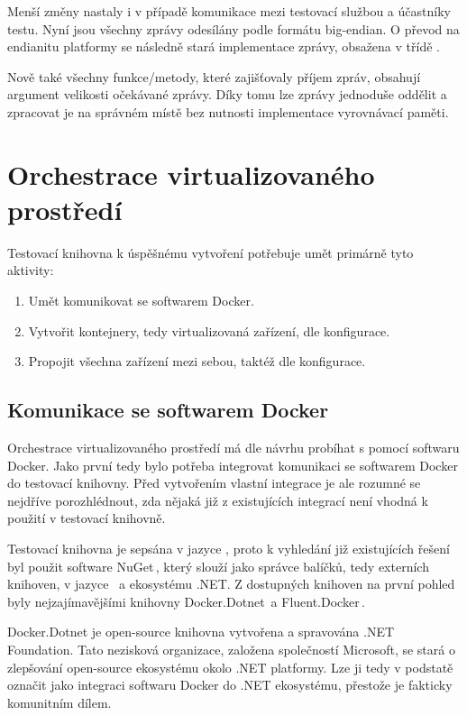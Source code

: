 Menší změny nastaly i v případě komunikace mezi testovací službou a účastníky testu. Nyní jsou všechny zprávy odesílány podle formátu big-endian. O převod na endianitu platformy se následně stará implementace zprávy, obsažena v třídě . 

Nově také všechny funkce/metody, které zajišťovaly příjem zpráv, obsahují argument velikosti očekávané zprávy. Díky tomu lze zprávy jednoduše oddělit a zpracovat je na správném místě bez nutnosti implementace vyrovnávací paměti.

\section{Orchestrace virtualizovaného prostředí}

Testovací knihovna k úspěšnému vytvoření potřebuje umět primárně tyto aktivity:

\begin{enumerate}
    \item Umět komunikovat se softwarem Docker.
    \item Vytvořit kontejnery, tedy virtualizovaná zařízení, dle konfigurace.
    \item Propojit všechna zařízení mezi sebou, taktéž dle konfigurace.
\end{enumerate}

\subsection{Komunikace se softwarem Docker}
Orchestrace virtualizovaného prostředí má dle návrhu probíhat s pomocí softwaru Docker. 
Jako první tedy bylo potřeba integrovat komunikaci se softwarem Docker do testovací knihovny. Před vytvořením vlastní integrace je ale rozumné se nejdříve porozhlédnout, zda nějaká již z existujících integrací není vhodná k použití v testovací knihovně. 

Testovací knihovna je sepsána v jazyce \csharp, proto k vyhledání již existujících řešení byl použit software NuGet\,\cite{nuget}, který slouží jako správce balíčků, tedy externích knihoven, v jazyce \csharp\, a ekosystému .NET. Z dostupných knihoven na první pohled byly nejzajímavějšími knihovny Docker.Dotnet\,\cite{dockerdotnet} a Fluent.Docker\,\cite{fluentdocker}. 

Docker.Dotnet je open-source knihovna vytvořena a spravována .NET Foundation. Tato nezisková organizace, založena společností Microsoft, se stará o zlepšování open-source ekosystému okolo .NET platformy\cite{dotnetfoundation}. Lze ji tedy v podstatě označit jako  integraci softwaru Docker do .NET ekosystému, přestože je fakticky komunitním dílem. 

